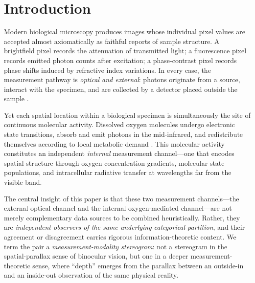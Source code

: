 \documentclass[11pt,twocolumn,a4paper]{article}
\begin{document}
\section{Introduction}\label{sec:introduction}

Modern biological microscopy produces images whose individual pixel values are accepted almost axiomatically as faithful reports of sample structure.
A brightfield pixel records the attenuation of transmitted light; a fluorescence pixel records emitted photon counts after excitation; a phase-contrast pixel records phase shifts induced by refractive index variations.
In every case, the measurement pathway is \emph{optical and external}: photons originate from a source, interact with the specimen, and are collected by a detector placed outside the sample \citep{Murphy2012,Mertz2019}.

Yet each spatial location within a biological specimen is simultaneously the site of continuous molecular activity.
Dissolved oxygen molecules undergo electronic state transitions, absorb and emit photons in the mid-infrared, and redistribute themselves according to local metabolic demand \citep{Wilson2008,Carreau2011}.
This molecular activity constitutes an independent \emph{internal} measurement channel---one that encodes spatial structure through oxygen concentration gradients, molecular state populations, and intracellular radiative transfer at wavelengths far from the visible band.

The central insight of this paper is that these two measurement channels---the external optical channel and the internal oxygen-mediated channel---are not merely complementary data sources to be combined heuristically.
Rather, they are \emph{independent observers of the same underlying categorical partition}, and their agreement or disagreement carries rigorous information-theoretic content.
We term the pair a \emph{measurement-modality stereogram}: not a stereogram in the spatial-parallax sense of binocular vision, but one in a deeper measurement-theoretic sense, where ``depth'' emerges from the parallax between an outside-in and an inside-out observation of the same physical reality.

\end{document}
